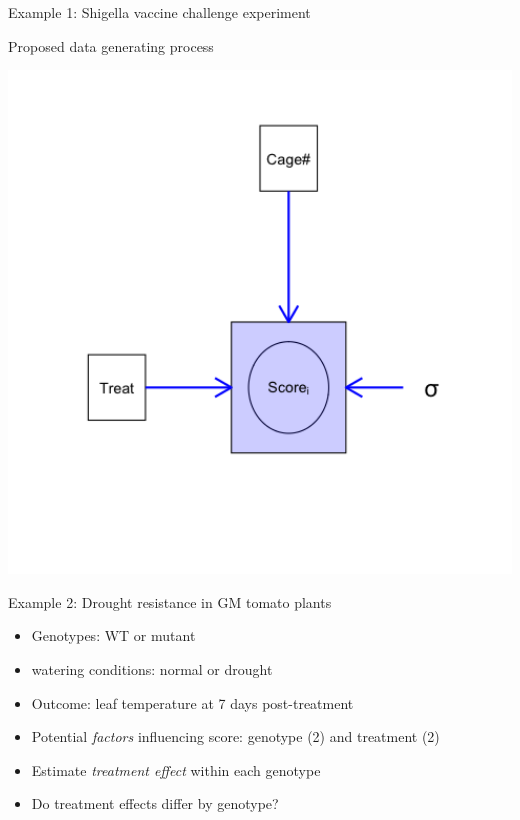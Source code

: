 \documentclass[
  12pt,
  ignorenonframetext,
  aspectratio=169,
]{beamer}
\begin{document}
\begin{frame}{Example 1: Shigella vaccine challenge experiment}
\protect\hypertarget{example-1-shigella-vaccine-challenge-experiment-1}{}

\begin{block}{Proposed data generating process}

\begin{center}\includegraphics[width=6.67in]{../images/Lecture3_gm_vaccine} \end{center}

\end{block}

\end{frame}

\begin{frame}{Example 2: Drought resistance in GM tomato plants}
\protect\hypertarget{example-2-drought-resistance-in-gm-tomato-plants}{}

\begin{itemize}
\item
  Genotypes: WT or mutant
\item
  watering conditions: normal or drought
\item
  Outcome: leaf temperature at 7 days post-treatment
\item
  Potential \emph{factors} influencing score: genotype (2) and treatment
  (2)
\item
  Estimate \emph{treatment effect} within each genotype
\item
  Do treatment effects differ by genotype?
\end{itemize}

\end{frame}
\end{document}
